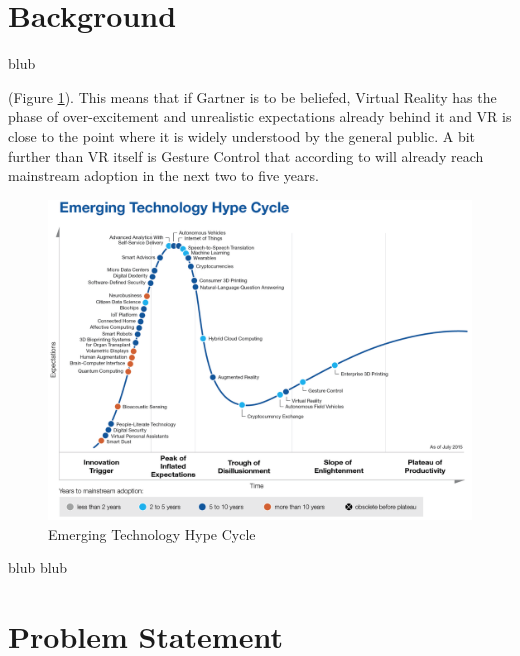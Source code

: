 \section{Background}

blub


(Figure \ref{fig:hypecycle}). This means that if Gartner is to be beliefed, Virtual Reality has the phase of over-excitement and unrealistic expectations already behind it and VR is close to the point where it is widely understood by the general public. A bit further than VR itself is Gesture Control that according to \cite{Gartner2015} will already reach mainstream adoption in the next two to five years.
\begin{figure}[h]
	\begin{center}
		\includegraphics[width=14cm]{03_Figures/03_Gartner/Gartner_EmergingTech2015.png}
		\caption[Emerging Technology Hype Cycle]{Emerging Technology Hype Cycle \citep{Gartner2015b}}
		\label{fig:hypecycle}
	\end{center}
\end{figure}



blub
\cite{Safrudin2015}
blub


\section{Problem Statement}

